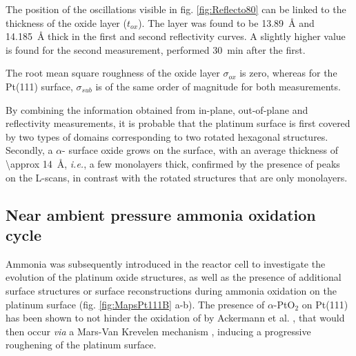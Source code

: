 The position of the oscillations visible in fig. \ref{fig:Reflecto80} can be linked to the thickness of the oxide layer ($t_{ox}$).
The layer was found to be \qty{13.89}{\angstrom} and \qty{14.185}{\angstrom} thick in the first and second reflectivity curves.
A slightly higher value is found for the second measurement, performed \qty{30}{\minute} after the first.

The root mean square roughness of the oxide layer $\sigma_{ox}$ is zero, whereas for the Pt(111) surface, $\sigma_{sub}$ is of the same order of magnitude for both measurements.

By combining the information obtained from in-plane, out-of-plane and reflectivity measurements, it is probable that the platinum surface is first covered by two types of domains corresponding to two rotated hexagonal structures.
Secondly, a $\alpha$- surface oxide grows on the surface, with an average thickness of \qty{\approx 14}{\angstrom}, \textit{i.e.}, a few monolayers thick, confirmed by the presence of peaks on the L-scans, in contrast with the rotated structures that are only monolayers.


\subsection{Near ambient pressure ammonia oxidation cycle}

Ammonia was subsequently introduced in the reactor cell to investigate the evolution of the platinum oxide structures, as well as the presence of additional surface structures or surface reconstructions during ammonia oxidation on the platinum surface (fig. \ref{fig:MapsPt111B} a-b).
The presence of $\alpha$-PtO$_2$ on Pt(111) has been shown to not hinder the oxidation of  by Ackermann et al. \parencite*{Ackermann2007}, that would then occur \textit{via} a Mars-Van Krevelen mechanism \parencite{Mars1954}, inducing a progressive roughening of the platinum surface.

